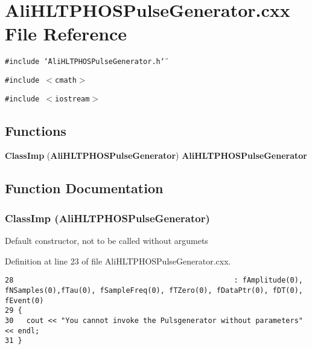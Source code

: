 \section{Ali\-HLTPHOSPulse\-Generator.cxx File Reference}
\label{AliHLTPHOSPulseGenerator_8cxx}


{\tt \#include \char`\"{}Ali\-HLTPHOSPulse\-Generator.h\char`\"{}}\par
{\tt \#include $<$cmath$>$}\par
{\tt \#include $<$iostream$>$}\par
\subsection*{Functions}
\begin{CompactItemize}
\item 
{\bf Class\-Imp} ({\bf Ali\-HLTPHOSPulse\-Generator}) {\bf Ali\-HLTPHOSPulse\-Generator}
\end{CompactItemize}


\subsection{Function Documentation}
\subsubsection{\setlength{\rightskip}{0pt plus 5cm}Class\-Imp ({\bf Ali\-HLTPHOSPulse\-Generator})}\label{AliHLTPHOSPulseGenerator_8cxx_a0}


Default constructor, not to be called without argumets 

Definition at line 23 of file Ali\-HLTPHOSPulse\-Generator.cxx.

\footnotesize\begin{verbatim}28                                                   : fAmplitude(0), fNSamples(0),fTau(0), fSampleFreq(0), fTZero(0), fDataPtr(0), fDT(0), fEvent(0)
29 {
30   cout << "You cannot invoke the Pulsgenerator without parameters" << endl;
31 }
\end{verbatim}\normalsize 


